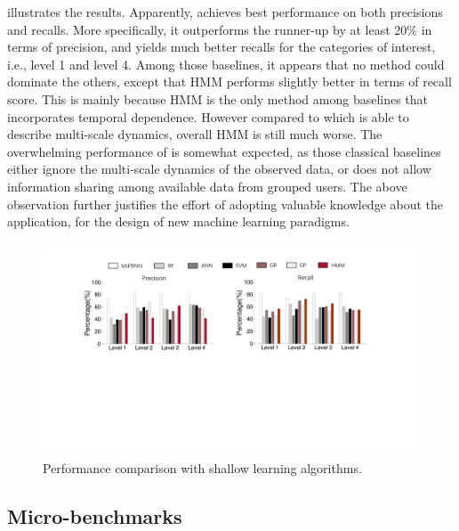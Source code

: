  illustrates the results.
Apparently, \modelname achieves best performance on both precisions and recalls.
More specifically, it outperforms the runner-up by at least 20\% in terms of precision, and yields much better recalls for the categories of interest, i.e., level 1 and level 4. Among those baselines, it appears that no method could dominate the others, except that HMM performs slightly better in terms of recall score. This is mainly because HMM is the only method among baselines that incorporates temporal dependence. However compared to \modelname which is able to describe multi-scale dynamics, overall HMM is still much worse.  The overwhelming performance of \modelname is somewhat expected, as those classical baselines either ignore the multi-scale dynamics of the observed data, or does not allow information sharing among available data from grouped users. The above observation further justifies the effort of adopting valuable knowledge about the application, for the design of new machine learning paradigms.
\begin{figure}[h]
  \centering
  \includegraphics[width=0.9\columnwidth]{./img/Model_CMP.pdf}
  \caption{Performance comparison with shallow learning algorithms.}
  \label{fig:cmp_models}
\end{figure}





\subsection{Micro-benchmarks}
